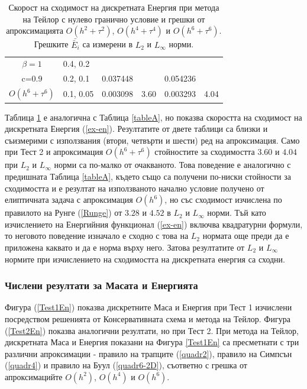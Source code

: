 \documentclass[a4paper]{article}
\newcommand{\rf}[1]{(\ref{#1})}
\theoremstyle{remark}
\begin{document}
\begin{table}[ht]
\begin{tabular}{||c|l|ll|ll||}
\hline
  $\beta=1$     	 	&0.4, 0.2   		&            	&         	&                  	&      \\
      c=0.9                 	&0.2, 0.1   		&0.037448	&         	& 0.054236      	&       \\
   $O(h^6+ \tau^6)$ &0.1, 0.05  		& 0.003098 	& 3.60 	& 0.003293  		& 4.04        \\
\hline
\hline 
		\end{tabular}
		\caption{Скорост на сходимост на дискретната Енергия при метода на Тейлор с нулево гранично условие и грешки от апроксимацията $O(h^{2} + \tau^2 )$, $O(h^{4} + \tau^4 )$ и $O(h^{6} + \tau^6 )$. Грешките $\bar{\bar E_i}$ са измерени в $L_2$ и $L_\infty$ норми.}
\label{tableB}
\end{table}
Таблица \ref{tableB} е аналогична с Таблица \ref{tableA}, но показва скоростта на сходимост на дискретната Енергия \rf{ex-en}. Резултатите от двете таблици са близки и съизмерими с използвания (втори, четвърти и шести) ред на апроксимация. Само при  Тест 2 и апроксимация $O(h^6 + \tau^6)$ стойностите за сходимостта $3.6$0 и $4.04$ при $L_2$ и $L_{\infty}$ норми са по-малко от очакваното. Това поведение е аналогично с предишната Таблица \ref{tableA}, където също са получени по-ниски стойности за сходимостта и е резултат на използваното начално условие получено от елиптичната задача с апроксимация $O(h^6)$, но със сходимост изчислена по правилото на Рунге \rf{Runge} от $3.28$ и $4.52$ в $L_2$ и $L_\infty$ норми. Тъй като изчислението на Енергийния функционал \rf{ex-en} включва квадратурни формули, то неговото поведение изначало е сходно с това на $L_2$ нормата още преди да е приложена каквато и да е норма върху него. Затова резултатите от $L_2$ и $L_\infty$ нормите при изчислението на сходимостта на дискретната енергия са сходни.

\subsubsection{Числени резултати за Масата и Енергията}
Фигура \rf{Test1En} показва дискретните Маса и Енергия при Тест 1 изчислени посредством решенията от Консервативната схема и метода на Тейлор. Фигура \rf{Test2En} показва аналогични резултати, но при Тест 2. При метода на Тейлор, дискретната Маса и Енергия показани на Фигура \ref{Test1En} са пресметнати с три различни апроксимации - правило на трапците \rf{quadr2}, правило на Симпсън \rf{quadr4} и правило на Буул \rf{quadr6-2D}, съответно с грешка от апроксимацийте $O(h^2)$, $O(h^4)$ и $O(h^6)$. 
\end{document}
